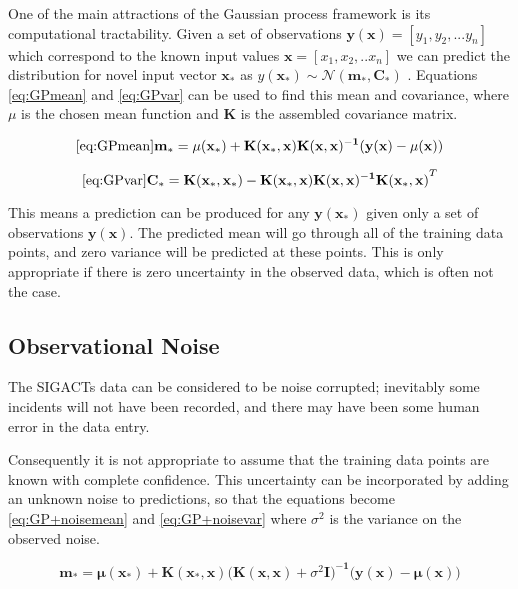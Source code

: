 \documentclass[a4paper,11pt]{report}
\begin{document}
One of the main attractions of the Gaussian process framework is its computational tractability. Given a set of observations \( \mathbf{y}( \mathbf{x} ) = [y_1, y_2, ... y_n] \) which correspond to the known input values \( \mathbf{x} = [x_1, x_2, .. x_n] \) we can predict the distribution for novel input vector \( \mathbf{x_*} \) as \( y( \mathbf{x_*}) \sim \mathcal{N}(\mathbf{m_*,C_*}) \) \cite{GP-robots}. Equations \ref{eq:GPmean} and \ref{eq:GPvar} can be used to find this mean and covariance, where \(\mu\) is the chosen mean function and \(\mathbf{K}\) is the assembled covariance matrix.

\singlespacing

\begin{equation} \ref{eq:GPmean}
\mathbf{m_* = \mu (x_*) + K(x_* ,x) K(x,x)^{-1} (y(x) - \mu (x))}
\end{equation}

\begin{equation} \ref{eq:GPvar}
\mathbf{ C_* = K(x_*,x_*)-K(x_*,x) K(x,x)^{-1} K(x_*,x)}^{T}
\end{equation}

\doublespacing

This means a prediction can be produced for any \(\mathbf{y(x_*)}\) given only a set of observations \(\mathbf{y(x)}\). The predicted mean will go through all of the training data points, and zero variance will be predicted at these points. This is only appropriate if there is zero uncertainty in the observed data, which is often not the case.

\subsection{Observational Noise}

The SIGACTs data can be considered to be noise corrupted; inevitably some incidents will not have been recorded, and there may have been some human error in the data entry. 

Consequently it is not appropriate to assume that the training data points are known with complete confidence. This uncertainty can be incorporated by adding an unknown noise to predictions, so that the equations become \ref{eq:GP+noisemean} and \ref{eq:GP+noisevar} where \( \sigma^2 \) is the variance on the observed noise.

\singlespacing


\begin{equation} \label{eq:GP+noisemean}
\mathbf{m_*} = \boldsymbol{\mu} \mathbf{(x_*) + K(x_* ,x) (K(x,x)}+\sigma^2 \mathbf{I)^{-1} (y(x)} - \boldsymbol{\mu} \mathbf{(x))}
\end{equation}
\end{document}
